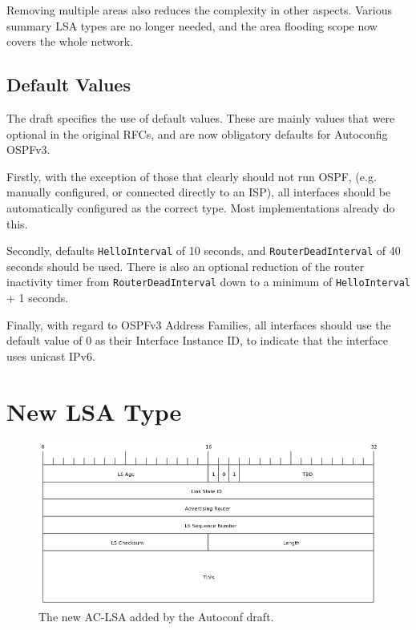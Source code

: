 \documentclass[12pt,a4paper,twoside]{report}
\begin{document}
Removing multiple areas also reduces the complexity in other aspects. Various
summary LSA types are no longer needed, and the area flooding scope now covers
the whole network.

\subsection{Default Values}
The draft specifies the use of default values. These are mainly values that were
optional in the original RFCs, and are now obligatory defaults for Autoconfig
OSPFv3\@. 

Firstly, with the exception of those that clearly should not run OSPF, (e.g.\@
manually configured, or connected directly to an ISP), all interfaces
should be automatically configured as the correct type. Most implementations
already do this. 

Secondly, defaults \texttt{HelloInterval} of 10 seconds, and
\texttt{RouterDeadInterval} of 40 seconds should be used. There is also an
optional reduction of the router inactivity timer from
\texttt{RouterDeadInterval} down to a minimum of \texttt{HelloInterval} + 1
seconds. 

Finally, with regard to OSPFv3 Address Families, all interfaces should use the
default value of 0 as their Interface Instance ID\@, to indicate that the
interface uses unicast IPv6.  

\section{New LSA Type}
\begin{figure}
\begin{center}
	\includegraphics[width=\linewidth]{../Diagrams/Packets/ac_lsa.png}
	\caption{The new AC-LSA added by the Autoconf draft.}\label{fig:AC-LSA}
\end{center}
\end{figure}
\end{document}
